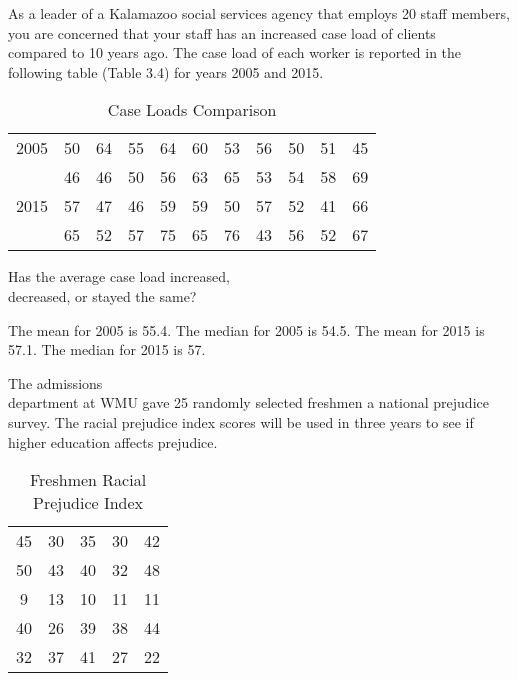 \documentclass[11pt]{book}\usepackage[]{graphicx}\usepackage[]{color}
\begin{document}
\begin{exercises}
\begin{exercise}
As a leader of a Kalamazoo social services agency that employs 20 staff members, you are concerned that your staff has an increased case load of clients \\ compared to 10 years ago.  The case load of each worker is reported in the following table (Table 3.4) for years 2005 and 2015.

\begin{table}[htbp]
   \centering
   \caption{Case Loads Comparison}
   {\tiny{
   \begin{tabular}{@{} ccccccccccc  @{}} \hline %
   2005 & 50&64&55&64&60&53&56&50&51&45 \\ & 46&46&50&56&63&65&53&54&58&69 \\ \hline
   2015 & 57&47&46&59&59&50&57&52&41&66 \\ & 65&52&57&75&65&76&43&56&52&67 \\ \hline
   \end{tabular}

   \label{tab:t3_4a}
   }}
\end{table}

  Has the average case load increased, \\ decreased, or stayed the same?

   \vspace{2mm}
  \end{exercise}
  \vspace{2mm}
  \begin{solution} %


The mean for 2005 is 55.4.
The median for 2005 is 54.5.
The mean for 2015 is 57.1.
The median for 2015 is 57.

  \end{solution}

  \begin{exercise} %

  The admissions \\ department at WMU gave 25 randomly selected freshmen a national prejudice survey.  The racial prejudice index scores  will be used in three years to see if higher education affects prejudice.

\begin{table}[htbp]
   \centering
   {\small{
   \caption{Freshmen Racial Prejudice Index}
   \begin{tabular}{@{} ccccc  @{}} \hline %
   45 & 30 & 35 & 30 & 42 \\
   50 & 43 & 40 & 32 & 48 \\
   9  & 13 & 10 & 11 & 11 \\
   40 & 26 & 39 & 38 & 44 \\
   32 & 37 & 41 & 27 & 22 \\ \hline
   \end{tabular}

}}
\end{table}
\end{exercise}
\end{exercises}
\end{document}
